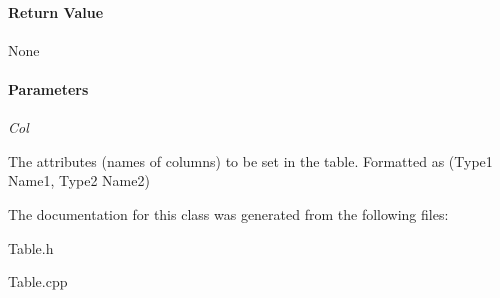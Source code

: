 \paragraph*{Return Value}



 None

\paragraph*{Parameters}



 {\itshape Col}
\begin{DoxyItemize}
\item The attributes (names of columns) to be set in the table. Formatted as (Type1 Name1, Type2 Name2) 
\end{DoxyItemize}

The documentation for this class was generated from the following files\-:\begin{DoxyCompactItemize}
\item 
Table.\-h\item 
Table.\-cpp\end{DoxyCompactItemize}
